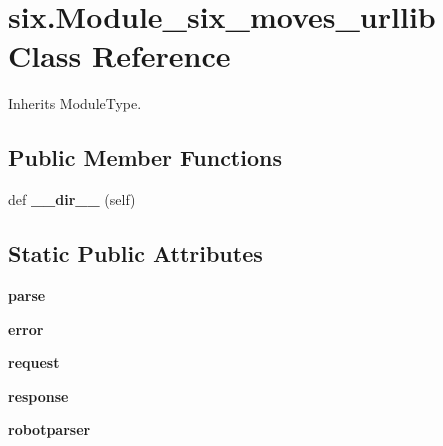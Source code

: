 \hypertarget{classsix_1_1_module__six__moves__urllib}{}\section{six.\+Module\+\_\+six\+\_\+moves\+\_\+urllib Class Reference}
\label{classsix_1_1_module__six__moves__urllib}


Inherits Module\+Type.

\subsection*{Public Member Functions}
\begin{DoxyCompactItemize}
\item 
\mbox{\label{classsix_1_1_module__six__moves__urllib_ae77be536edde9596744e3e44be72154d}} 
def {\bfseries \+\_\+\+\_\+dir\+\_\+\+\_\+} (self)
\end{DoxyCompactItemize}
\subsection*{Static Public Attributes}
\begin{DoxyCompactItemize}
\item 
\mbox{\label{classsix_1_1_module__six__moves__urllib_a297da7afa8c7e545c10729acbcee0d7e}} 
{\bfseries parse}
\item 
\mbox{\label{classsix_1_1_module__six__moves__urllib_ae62d99fa26b40db4dc6bd44035da3366}} 
{\bfseries error}
\item 
\mbox{\label{classsix_1_1_module__six__moves__urllib_ad01879ed6d641e8d9b1155f3b31134d2}} 
{\bfseries request}
\item 
\mbox{\label{classsix_1_1_module__six__moves__urllib_aed88e052724012eaa5f6cc8e02153379}} 
{\bfseries response}
\item 
\mbox{\label{classsix_1_1_module__six__moves__urllib_aac7f36892f328cd15d85d3569a2664c4}} 
{\bfseries robotparser}
\end{DoxyCompactItemize}


